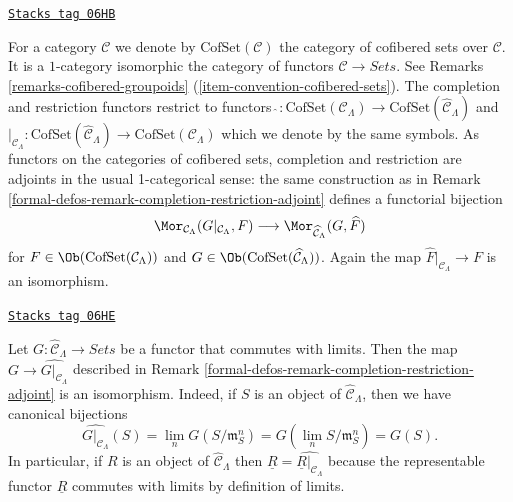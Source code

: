 \begin{remark}
\label{formal-defos-remark-completion-restriction-cofset-adjoint}
\href{https://stacks.math.columbia.edu/tag/06HB}{\texttt{Stacks tag 06HB}}

For a category $\mathcal{C}$ we denote by $\text{CofSet}(\mathcal{C})$ the
category of cofibered sets over $\mathcal{C}$. It is a $1$-category
isomorphic the category of functors $\mathcal{C} \to \textit{Sets}$.
See Remarks \ref{remarks-cofibered-groupoids}
(\ref{item-convention-cofibered-sets}).
The completion and restriction functors restrict to functors
$\widehat{~} : \text{CofSet}(\mathcal{C}_\Lambda) \to
\text{CofSet}(\widehat{\mathcal{C}}_\Lambda)$ and
$|_{\mathcal{C}_\Lambda} : \text{CofSet}(\widehat{\mathcal{C}}_\Lambda) \to
\text{CofSet}(\mathcal{C}_\Lambda)$ which we denote by the same symbols.
As functors on the categories of cofibered sets, completion and restriction
are adjoints in the usual 1-categorical sense: the same construction as in
Remark \ref{formal-defos-remark-completion-restriction-adjoint} defines a functorial
bijection
$$
\Mor_{\mathcal{C}_\Lambda}(G|_{\mathcal{C}_\Lambda}, F)
\longrightarrow
\Mor_{\widehat{\mathcal{C}}_\Lambda}(G, \widehat{F})
$$
for $F \in \Ob(\text{CofSet}(\mathcal{C}_\Lambda))$ and
$G \in \Ob(\text{CofSet}(\widehat{\mathcal{C}}_\Lambda))$.
Again the map $\widehat{F}|_{\mathcal{C}_\Lambda} \to F$ is an
isomorphism.
\end{remark}

\begin{remark}
\label{formal-defos-remark-restrict-complete-continuous-functor}
\href{https://stacks.math.columbia.edu/tag/06HE}{\texttt{Stacks tag 06HE}}

Let $G : \widehat{\mathcal{C}}_\Lambda \to \textit{Sets}$
be a functor that commutes with limits.
Then the map $G \to \widehat{G|_{\mathcal{C}_\Lambda}}$ described in
Remark \ref{formal-defos-remark-completion-restriction-adjoint}
is an isomorphism. Indeed, if $S$ is  an object of
$\widehat{\mathcal{C}}_\Lambda$, then we have canonical bijections
$$
\widehat{G|_{\mathcal{C}_\Lambda}}(S) =
\lim_n G(S/\mathfrak{m}_S^n) =
G(\lim_n S/\mathfrak{m}_S^n) = G(S).
$$
In particular, if $R$ is an object of $\widehat{\mathcal{C}}_\Lambda$ then
$\underline{R} = \widehat{\underline{R}|_{\mathcal{C}_\Lambda}}$ because
the representable functor $\underline{R}$ commutes with limits by definition
of limits.
\end{remark}

